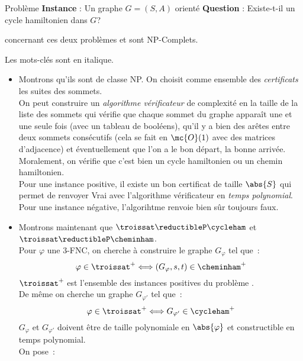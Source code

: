 \begin{definition}{}{Problème \cycleham}
    \textbf{Instance} : Un graphe $G=(S,A)$ orienté
    \textbf{Question} : Existe-t-il un cycle hamiltonien dans $G$?
\end{definition}

\begin{proposition}{}{concernant ces deux problèmes}
    \cheminham et \cycleham sont NP-Complets.
\end{proposition}

\begin{demonstration}
    Les mots-clés sont en italique.
    \begin{itemize}
        \item Montrons qu'ils sont de classe NP. On choisit comme ensemble des \textit{certificats} les suites des sommets.\\
        On peut construire un \textit{algorithme vérificateur} de complexité en la taille de la liste des sommets qui vérifie que chaque sommet du graphe apparaît une et une seule fois (avec un tableau de booléens), qu'il y a bien des arêtes entre deux sommets consécutifs (cela se fait en $\mc{O}(1)$ avec des matrices d'adjacence) et éventuellement que l'on a le bon départ, la bonne arrivée.\\
        Moralement, on vérifie que c'est bien un cycle hamiltonien ou un chemin hamiltonien.\\
        Pour une instance positive, il existe un bon certificat de taille $\abs{S}$ qui permet de renvoyer Vrai avec l'algorithme vérificateur en \textit{temps polynomial}.\\
        Pour une instance négative, l'algorihtme renvoie bien sûr toujours faux.
        \item Montrons maintenant que $\troissat \reductibleP \cycleham$ et $\troissat \reductibleP \cheminham$.\\
        Pour $\varphi$ une 3-FNC, on cherche à construire le graphe $G_\varphi$ tel que~:
        $$\varphi \in \troissat^+ \Longleftrightarrow (G_\varphi,s,t) \in \cheminham^+$$
        $\troissat^+$ est l'ensemble des instances positives du problème \troissat. \\
        De même on cherche un graphe $G_{\varphi'}$ tel que~:
        $$\varphi \in \troissat^+ \Longleftrightarrow G_{\varphi'} \in \cycleham^+$$
        $G_\varphi$ et $G_{\varphi'}$ doivent être de taille polynomiale en $\abs{\varphi}$ et constructible en temps polynomial.\\
        On pose~:

\end{itemize}
\end{demonstration}
